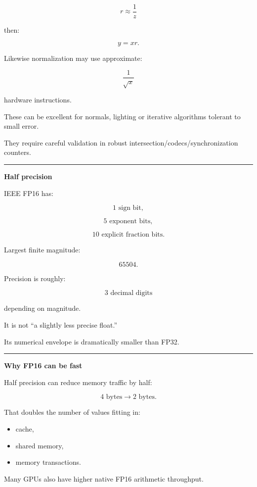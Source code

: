 \[
r\approx\frac1z
\]

then:

\[
y=xr.
\]

Likewise normalization may use approximate:

\[
\frac1{\sqrt{x}}
\]

hardware instructions.

These can be excellent for normals, lighting or iterative algorithms tolerant to small error.

They require careful validation in robust intersection/codecs/synchronization counters.

\begin{center}\rule{0.5\linewidth}{0.5pt}\end{center}

\textbf{Half precision}

IEEE FP16 has:

\[
1\text{ sign bit},
\]

\[
5\text{ exponent bits},
\]

\[
10\text{ explicit fraction bits}.
\]

Largest finite magnitude:

\[
65504.
\]

Precision is roughly:

\[
3\text{ decimal digits}
\]

depending on magnitude.

It is not ``a slightly less precise float.''

Its numerical envelope is dramatically smaller than FP32.

\begin{center}\rule{0.5\linewidth}{0.5pt}\end{center}

\textbf{Why FP16 can be fast}

Half precision can reduce memory traffic by half:

\[
4\text{ bytes}
\rightarrow
2\text{ bytes}.
\]

That doubles the number of values fitting in:

\begin{itemize}
\tightlist
\item
  cache,
\item
  shared memory,
\item
  memory transactions.
\end{itemize}

Many GPUs also have higher native FP16 arithmetic throughput.

